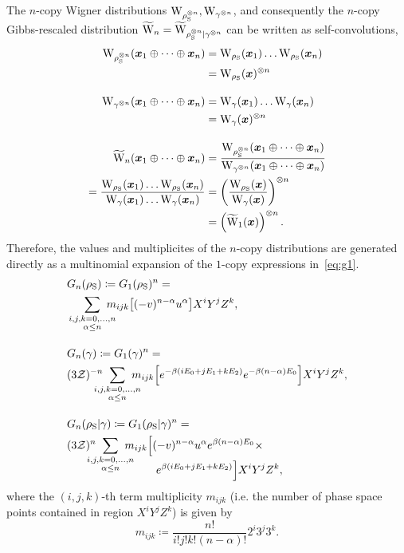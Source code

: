\documentclass[pra,
aps,
twocolumn,
superscriptaddress,
groupedaddress,
nofootinbib,
reprint
]{revtex4-1}
\begin{document}
The $n$-copy Wigner distributions $\W{\noisys\too{n}}, \W{\gamma\too{n}}$, and consequently the $n$-copy Gibbs-rescaled distribution $\widetilde{\rm{W}}_n = \widetilde{\rm{W}}_{\rho_{\rm{S}}^{\otimes n}|\gamma^{\otimes n}}$ can be written as self-convolutions,
\begin{align}
	\W{\noisys\too{n}}(\bmx_1 \oplus \dots \oplus \bmx_n) &= \W{\noisys}(\bmx_1)\dots\W{\noisys}(\bmx_n) \nonumber\\
	&= \W{\noisys}(\bmx)\too{n} \\[10pt]
	\W{\gamma\too{n}}(\bmx_1 \oplus \dots \oplus \bmx_n) &= \W{\gamma}(\bmx_1)\dots\W{\gamma}(\bmx_n) \nonumber\\
	&= \W{\gamma}(\bmx)\too{n} \\[10pt]
	\widetilde{\rm{W}}_n(\bmx_1 \oplus \dots \oplus \bmx_n) &= \frac{\W{\noisys\too{n}}(\bmx_1 \oplus \dots \oplus \bmx_n)}{\W{\gamma\too{n}}(\bmx_1 \oplus \dots \oplus \bmx_n)} \\
	= \frac{\W{\noisys}(\bmx_1)\dots\W{\noisys}(\bmx_n)}{\W{\gamma}(\bmx_1)\dots\W{\gamma}(\bmx_n)} &= \left( \frac{\W{\noisys}(\bmx)}{\W{\gamma}(\bmx)} \right)\too{n} \nonumber\\
	&= \left( \widetilde{\rm{W}}_1(\bmx)\right) \too{n}. \nonumber
\end{align}
Therefore, the values and multiplicites of the $n$-copy distributions are generated directly as a multinomial expansion of the $1$-copy expressions in~\cref{eq:g1}.
\begin{align}\label{eq:gn}
	&G_n(\noisys) \coloneqq G_1(\noisys)^n = \\
	&\sum\limits_{\substack{i,j,k = 0,\dots,n \\ \alpha \leq n}}\hspace{-10pt} m_{ijk} \big[(-\wn)^{n-\alpha} \wp^{\alpha} \big] X^i Y^j Z^k, \nonumber
	\\[10pt]
	&G_n(\gamma) \coloneqq G_1(\gamma)^n = \\
	&(3\Z)^{-n}\hspace{-10pt} \sum\limits_{\substack{i,j,k = 0,\dots,n \\ \alpha \leq n}}\hspace{-10pt} m_{ijk} \Big[ e^{-\beta ( i E_0 + j E_1 + k E_2 )} e^{-\beta (n-\alpha)E_0} \Big] X^i Y^j Z^k, \nonumber
	\\[10pt]
	&G_n(\noisys|\gamma) \coloneqq G_1(\noisys|\gamma)^n = \\
	&(3\Z)^{n}\hspace{-10pt} \sum\limits_{\substack{i,j,k = 0,\dots,n \\ \alpha \leq n}}\hspace{-10pt} m_{ijk} \Big[ (-\wn)^{n-\alpha} \wp^{\alpha} e^{\beta (n-\alpha)E_0} \times \nonumber\\[-15pt]
	&\hspace{80pt} e^{\beta ( i E_0 + j E_1 + k E_2 )} \Big] X^i Y^j Z^k, \nonumber
\end{align}
where the $(i,j,k)$-th term multiplicity $m_{ijk}$ (i.e. the number of phase space points contained in region $X^i Y^j Z^k$) is given by
\begin{equation}
	m_{ijk} \coloneqq \frac{n!}{i!j!k!(n-\alpha)!} 2^i 3^j 3^k.
\end{equation}
\end{document}
